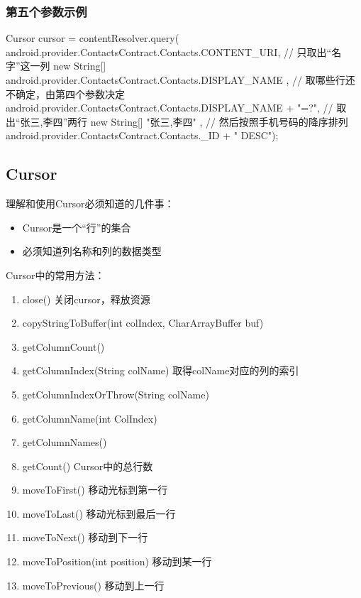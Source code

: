 ﻿\documentclass[a4paper,11pt]{article}
\begin{document}
\subsubsection[第五个参数示例]{第五个参数示例}
\begin{javacode}
Cursor cursor = contentResolver.query(
    android.provider.ContactsContract.Contacts.CONTENT_URI,
    // 只取出“名字”这一列
    new String[]{ android.provider.ContactsContract.Contacts.DISPLAY_NAME },
    // 取哪些行还不确定，由第四个参数决定
    android.provider.ContactsContract.Contacts.DISPLAY_NAME + "=?",
    // 取出“张三,李四”两行
    new String[]{ "张三,李四" },
    // 然后按照手机号码的降序排列
    android.provider.ContactsContract.Contacts._ID + " DESC");  
\end{javacode}

\subsection[Cursor]{Cursor}
理解和使用Cursor必须知道的几件事：\\
\begin{itemize}
\item Cursor是一个“行”的集合
\item 必须知道列名称和列的数据类型
\end{itemize}

Cursor中的常用方法：

\begin{enumerate}
\item close() 关闭cursor，释放资源
\item copyStringToBuffer(int colIndex, CharArrayBuffer buf)
\item getColumnCount()
\item getColumnIndex(String colName) 取得colName对应的列的索引
\item getColumnIndexOrThrow(String colName)
\item getColumnName(int ColIndex)
\item getColumnNames()
\item getCount() Cursor中的总行数
\item moveToFirst() 移动光标到第一行
\item moveToLast() 移动光标到最后一行
\item moveToNext() 移动到下一行
\item moveToPosition(int position) 移动到某一行
\item moveToPrevious() 移动到上一行
\end{enumerate}
\end{document}
